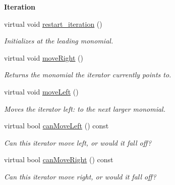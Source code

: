 \begin{Indent}\textbf{ Iteration}\par
\begin{DoxyCompactItemize}
\item 
\mbox{\label{class_l_l_polynomial___iterator_a64909cb28ff4fb7a7dd64428a496c163}} 
virtual void \hyperlink{class_l_l_polynomial___iterator_a64909cb28ff4fb7a7dd64428a496c163}{restart\+\_\+iteration} ()
\begin{DoxyCompactList}\small\item\em Initializes at the leading monomial. \end{DoxyCompactList}\item 
virtual void \hyperlink{class_l_l_polynomial___iterator_a940e0d03494ae2f5aefaf96dd8c0c49f}{move\+Right} ()
\begin{DoxyCompactList}\small\item\em Returns the monomial the iterator currently points to. \end{DoxyCompactList}\item 
\mbox{\label{class_l_l_polynomial___iterator_a3e3f59f2f5127b3599e23d0fb98b7b6c}} 
virtual void \hyperlink{class_l_l_polynomial___iterator_a3e3f59f2f5127b3599e23d0fb98b7b6c}{move\+Left} ()
\begin{DoxyCompactList}\small\item\em Moves the iterator left\+: to the next larger monomial. \end{DoxyCompactList}\item 
\mbox{\label{class_l_l_polynomial___iterator_a0c717d715ecee940b5ef78fc335701c9}} 
virtual bool \hyperlink{class_l_l_polynomial___iterator_a0c717d715ecee940b5ef78fc335701c9}{can\+Move\+Left} () const
\begin{DoxyCompactList}\small\item\em Can this iterator move left, or would it fall off? \end{DoxyCompactList}\item 
\mbox{\label{class_l_l_polynomial___iterator_ada3d3d730eecb75fcdb91ee66e2d9dbf}} 
virtual bool \hyperlink{class_l_l_polynomial___iterator_ada3d3d730eecb75fcdb91ee66e2d9dbf}{can\+Move\+Right} () const
\begin{DoxyCompactList}\small\item\em Can this iterator move right, or would it fall off? \end{DoxyCompactList}\item 

\end{DoxyCompactItemize}
\end{Indent}
